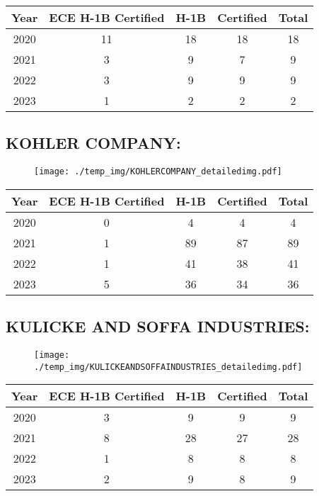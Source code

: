 \documentclass{article}%
\begin{document}
%
\begin{longtable}{c|c|c|c|c}%
\hline%
Year&ECE H{-}1B Certified&H{-}1B&Certified&Total\\%
\hline%
2020&11&18&18&18\\%
\hline%
2021&3&9&7&9\\%
\hline%
2022&3&9&9&9\\%
\hline%
2023&1&2&2&2\\%
\hline%
\end{longtable}

%
\newpage%
\subsection{KOHLER COMPANY:}%
\label{subsec:KOHLERCOMPANY}%
\label{KOHLERCOMPANYdetailed}%


\begin{figure}[htbp]%
\centering%
\texttt{[image: ./temp\_img/KOHLERCOMPANY\_detailedimg.pdf]}%
\end{figure}

%
\begin{longtable}{c|c|c|c|c}%
\hline%
Year&ECE H{-}1B Certified&H{-}1B&Certified&Total\\%
\hline%
2020&0&4&4&4\\%
\hline%
2021&1&89&87&89\\%
\hline%
2022&1&41&38&41\\%
\hline%
2023&5&36&34&36\\%
\hline%
\end{longtable}

%
\newpage%
\subsection{KULICKE AND SOFFA INDUSTRIES:}%
\label{subsec:KULICKEANDSOFFAINDUSTRIES}%
\label{KULICKEANDSOFFAINDUSTRIESdetailed}%


\begin{figure}[htbp]%
\centering%
\texttt{[image: ./temp\_img/KULICKEANDSOFFAINDUSTRIES\_detailedimg.pdf]}%
\end{figure}

%
\begin{longtable}{c|c|c|c|c}%
\hline%
Year&ECE H{-}1B Certified&H{-}1B&Certified&Total\\%
\hline%
2020&3&9&9&9\\%
\hline%
2021&8&28&27&28\\%
\hline%
2022&1&8&8&8\\%
\hline%
2023&2&9&8&9\\%
\hline%
\end{longtable}
\end{document}
